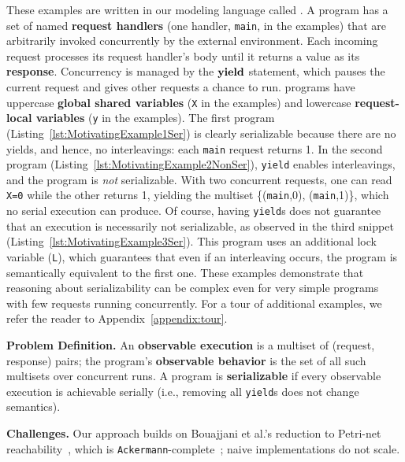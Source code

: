 These examples are written in our modeling language called \toolname.
A \toolname{} program has a set of named \textbf{request handlers} (one handler, \texttt{main}, in the examples) that are arbitrarily invoked concurrently by the external environment.
Each incoming request processes its request handler's body until it returns a value as its \textbf{response}. Concurrency is managed by the \(\textbf{yield}\)
 statement, which pauses the current request and gives other requests a chance to run. \toolname{} programs have uppercase \textbf{global shared variables} (\texttt{X} in the examples) and lowercase \textbf{request-local variables} (\texttt{y} in the examples).
%
%
%
The first program (Listing~\ref{lst:MotivatingExample1Ser}) is clearly serializable because there are no yields, and hence, no interleavings: each \texttt{main} request returns 1.
In the second program (Listing~\ref{lst:MotivatingExample2NonSer}), \texttt{yield} enables interleavings, and the program is \emph{not} serializable. With two concurrent requests, one can read \texttt{X=0} while the other returns 1, yielding the multiset \{(\texttt{main},0), (\texttt{main},1)\}, which no serial execution can produce.
Of course, having \texttt{yield}s does not guarantee that an execution is necessarily not serializable, as observed in the third snippet (Listing~\ref{lst:MotivatingExample3Ser}). This program uses an additional lock variable (\texttt{L}), which guarantees that even if an interleaving occurs, the program is semantically equivalent to the first one.
%
These examples demonstrate that reasoning about serializability can be complex even for very simple programs with few requests running concurrently.
%
For a tour of additional examples, we refer the reader to Appendix~\ref{appendix:tour}.

\smallskip
\noindent
\textbf{Problem Definition.}
An \textbf{observable execution} is a multiset of (request, response) pairs; the program’s \textbf{observable behavior} is the set of all such multisets over concurrent runs. A \toolname{} program is \textbf{serializable} if every observable execution is achievable serially (i.e., removing all \texttt{yield}s does not change semantics).

\smallskip
\noindent
\textbf{Challenges.}
Our approach builds on Bouajjani et al.’s reduction to Petri-net reachability~\cite{BoEmEnHa13}, which is \texttt{Ackermann}-complete~\cite{CzWo22}; naive implementations do not scale.

